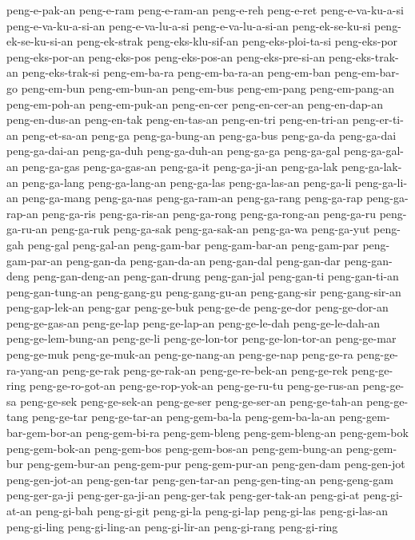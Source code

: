 {peng-e-pak-an peng-e-ram peng-e-ram-an peng-e-reh peng-e-ret
peng-e-va-ku-a-si peng-e-va-ku-a-si-an peng-e-va-lu-a-si
peng-e-va-lu-a-si-an peng-ek-se-ku-si peng-ek-se-ku-si-an peng-ek-strak
peng-eks-klu-sif-an peng-eks-ploi-ta-si peng-eks-por peng-eks-por-an
peng-eks-pos peng-eks-pos-an peng-eks-pre-si-an peng-eks-trak-an
peng-eks-trak-si peng-em-ba-ra peng-em-ba-ra-an peng-em-ban peng-em-bar-go
peng-em-bun peng-em-bun-an peng-em-bus peng-em-pang peng-em-pang-an
peng-em-poh-an peng-em-puk-an peng-en-cer peng-en-cer-an peng-en-dap-an
peng-en-dus-an peng-en-tak peng-en-tas-an peng-en-tri peng-en-tri-an
peng-er-ti-an peng-et-sa-an peng-ga peng-ga-bung-an peng-ga-bus peng-ga-da
peng-ga-dai peng-ga-dai-an peng-ga-duh peng-ga-duh-an peng-ga-ga
peng-ga-gal peng-ga-gal-an peng-ga-gas peng-ga-gas-an peng-ga-it
peng-ga-ji-an peng-ga-lak peng-ga-lak-an peng-ga-lang peng-ga-lang-an
peng-ga-las peng-ga-las-an peng-ga-li peng-ga-li-an peng-ga-mang
peng-ga-nas peng-ga-ram-an peng-ga-rang peng-ga-rap peng-ga-rap-an
peng-ga-ris peng-ga-ris-an peng-ga-rong peng-ga-rong-an peng-ga-ru
peng-ga-ru-an peng-ga-ruk peng-ga-sak peng-ga-sak-an peng-ga-wa
peng-ga-yut peng-gah peng-gal peng-gal-an peng-gam-bar peng-gam-bar-an
peng-gam-par peng-gam-par-an peng-gan-da peng-gan-da-an peng-gan-dal
peng-gan-dar peng-gan-deng peng-gan-deng-an peng-gan-drung peng-gan-jal
peng-gan-ti peng-gan-ti-an peng-gan-tung-an peng-gang-gu peng-gang-gu-an
peng-gang-sir peng-gang-sir-an peng-gap-lek-an peng-gar peng-ge-buk
peng-ge-de peng-ge-dor peng-ge-dor-an peng-ge-gas-an peng-ge-lap
peng-ge-lap-an peng-ge-le-dah peng-ge-le-dah-an peng-ge-lem-bung-an
peng-ge-li peng-ge-lon-tor peng-ge-lon-tor-an peng-ge-mar peng-ge-muk
peng-ge-muk-an peng-ge-nang-an peng-ge-nap peng-ge-ra peng-ge-ra-yang-an
peng-ge-rak peng-ge-rak-an peng-ge-re-bek-an peng-ge-rek peng-ge-ring
peng-ge-ro-got-an peng-ge-rop-yok-an peng-ge-ru-tu peng-ge-rus-an
peng-ge-sa peng-ge-sek peng-ge-sek-an peng-ge-ser peng-ge-ser-an
peng-ge-tah-an peng-ge-tang peng-ge-tar peng-ge-tar-an peng-gem-ba-la
peng-gem-ba-la-an peng-gem-bar-gem-bor-an peng-gem-bi-ra peng-gem-bleng
peng-gem-bleng-an peng-gem-bok peng-gem-bok-an peng-gem-bos
peng-gem-bos-an peng-gem-bung-an peng-gem-bur peng-gem-bur-an peng-gem-pur
peng-gem-pur-an peng-gen-dam peng-gen-jot peng-gen-jot-an peng-gen-tar
peng-gen-tar-an peng-gen-ting-an peng-geng-gam peng-ger-ga-ji
peng-ger-ga-ji-an peng-ger-tak peng-ger-tak-an peng-gi-at peng-gi-at-an
peng-gi-bah peng-gi-git peng-gi-la peng-gi-lap peng-gi-las peng-gi-las-an
peng-gi-ling peng-gi-ling-an peng-gi-lir-an peng-gi-rang peng-gi-ring
}
